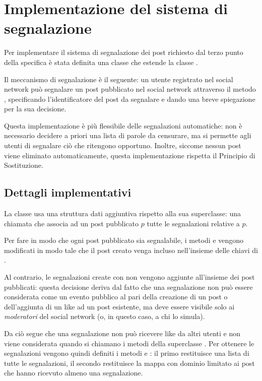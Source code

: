\section{Implementazione del sistema di segnalazione}
\label{sec:reports}

Per implementare il sistema di segnalazione dei post richiesto dal terzo punto della specifica è stata definita una classe  che estende la classe .

Il meccanismo di segnalazione è il seguente: un utente registrato nel social network può segnalare un post pubblicato nel social network attraverso il metodo , specificando l'identificatore del post da segnalare e dando una breve spiegazione per la sua decisione.

Questa implementazione è più flessibile delle segnalazioni automatiche: non è necessario decidere a priori una lista di parole da censurare, ma si permette agli utenti di segnalare ciò che ritengono opportuno. Inoltre, siccome nessun post viene eliminato automaticamente, questa implementazione rispetta il Principio di Sostituzione.

\subsection*{Dettagli implementativi}

La classe  usa una struttura dati aggiuntiva rispetto alla sua superclasse: una  chiamata  che associa ad un post pubblicato $p$ tutte le segnalazioni relative a $p$.

Per fare in modo che ogni post pubblicato sia segnalabile, i metodi  e  vengono modificati in modo tale che il post creato venga incluso nell'insieme delle chiavi di .

Al contrario, le segnalazioni create con  non vengono aggiunte all'insieme dei post pubblicati: questa decisione deriva dal fatto che una segnalazione non può essere considerata come un evento pubblico al pari della creazione di un post o dell'aggiunta di un like ad un post esistente, ma deve essere visibile solo ai \emph{moderatori} del social network (o, in questo caso, a chi lo simula).

Da ciò segue che una segnalazione non può ricevere like da altri utenti e non viene considerata quando si chiamano i metodi della superclasse . Per ottenere le segnalazioni vengono quindi definiti i metodi  e : il primo restituisce una lista di tutte le segnalazioni, il secondo restituisce la mappa  con dominio limitato ai post che hanno ricevuto almeno una segnalazione.
